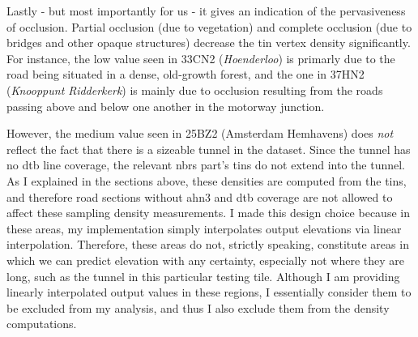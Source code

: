 Lastly - but most importantly for us - it gives an indication of the pervasiveness of occlusion. Partial occlusion (due to vegetation) and complete occlusion (due to bridges and other opaque structures) decrease the \ac{tin} vertex density significantly. For instance, the low value seen in 33CN2 (\textit{Hoenderloo}) is primarly due to the road being situated in a dense, old-growth forest, and the one in 37HN2 (\textit{Knooppunt Ridderkerk}) is mainly due to occlusion resulting from the roads passing above and below one another in the motorway junction.

However, the medium value seen in 25BZ2 (Amsterdam Hemhavens) does \textit{not} reflect the fact that there is a sizeable tunnel in the dataset. Since the tunnel has no \ac{dtb} line coverage, the relevant \ac{nbrs} part's \ac{tin}s do not extend into the tunnel. As I explained in the sections above, these densities are computed from the \ac{tin}s, and therefore road sections without \ac{ahn3} and \ac{dtb} coverage are not allowed to affect these sampling density measurements. I made this design choice because in these areas, my implementation simply interpolates output elevations via linear interpolation. Therefore, these areas do not, strictly speaking, constitute areas in which we can predict elevation with any certainty, especially not where they are long, such as the tunnel in this particular testing tile. Although I am providing linearly interpolated output values in these regions, I essentially consider them to be excluded from my analysis, and thus I also exclude them from the density computations.


